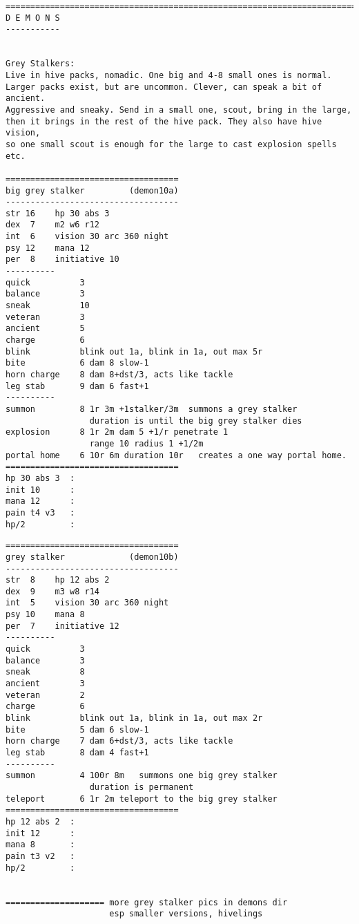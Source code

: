 \pagebreak[4]
\tiny \begin{samepage} \begin{verbatim}
================================================================================
D E M O N S
-----------


Grey Stalkers:
Live in hive packs, nomadic. One big and 4-8 small ones is normal.
Larger packs exist, but are uncommon. Clever, can speak a bit of ancient.
Aggressive and sneaky. Send in a small one, scout, bring in the large,
then it brings in the rest of the hive pack. They also have hive vision,
so one small scout is enough for the large to cast explosion spells etc.

===================================
big grey stalker         (demon10a)
-----------------------------------
str 16    hp 30 abs 3
dex  7    m2 w6 r12
int  6    vision 30 arc 360 night
psy 12    mana 12
per  8    initiative 10
----------
quick          3
balance        3
sneak          10
veteran        3
ancient        5
charge         6
blink          blink out 1a, blink in 1a, out max 5r
bite           6 dam 8 slow-1
horn charge    8 dam 8+dst/3, acts like tackle
leg stab       9 dam 6 fast+1
----------
summon         8 1r 3m +1stalker/3m  summons a grey stalker
                 duration is until the big grey stalker dies
explosion      8 1r 2m dam 5 +1/r penetrate 1
                 range 10 radius 1 +1/2m
portal home    6 10r 6m duration 10r   creates a one way portal home.
===================================
hp 30 abs 3  :
init 10      :
mana 12      :
pain t4 v3   :
hp/2         :

\end{verbatim} \end{samepage} \normalsize
\pagebreak[1]
\tiny \begin{samepage} \begin{verbatim}
===================================
grey stalker             (demon10b)
-----------------------------------
str  8    hp 12 abs 2
dex  9    m3 w8 r14
int  5    vision 30 arc 360 night
psy 10    mana 8
per  7    initiative 12
----------
quick          3
balance        3
sneak          8
ancient        3
veteran        2
charge         6
blink          blink out 1a, blink in 1a, out max 2r
bite           5 dam 6 slow-1
horn charge    7 dam 6+dst/3, acts like tackle
leg stab       8 dam 4 fast+1
----------
summon         4 100r 8m   summons one big grey stalker
                 duration is permanent
teleport       6 1r 2m teleport to the big grey stalker
===================================
hp 12 abs 2  :
init 12      :
mana 8       :
pain t3 v2   :
hp/2         :


==================== more grey stalker pics in demons dir
                     esp smaller versions, hivelings
\end{verbatim} \end{samepage} \normalsize

